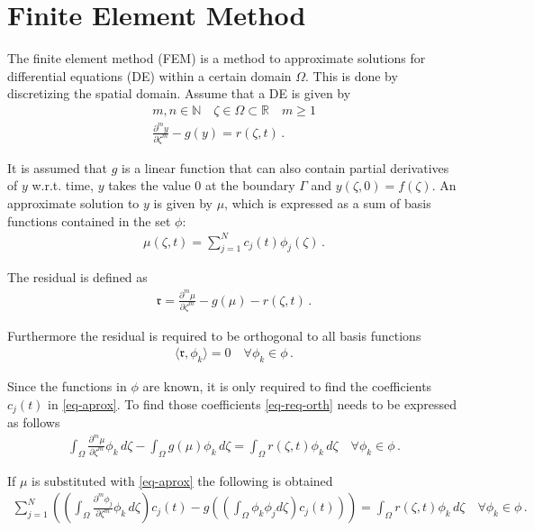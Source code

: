 \section{Finite Element Method} \label{FEM}
The finite element method (FEM) is a method to approximate solutions for differential equations (DE) within a certain domain \(\Omega\).
This is done by discretizing the spatial domain.
Assume that a DE is given by
\begin{gather}
m, n \in \mathbb{N} \quad \zeta \in \Omega \subset \mathbb{R} \quad m \geq 1 \\
\frac{\partial^{m} y}{\partial \zeta^{m}} -  g(y) = r(\zeta, t) \,. \label{eq-pde-gen} 
\end{gather}


It is assumed that \(g\) is a linear function that can also contain partial derivatives of \(y\) w.r.t. time, \(y\) takes the value 0 at the boundary \(\Gamma\) and \(y(\zeta, 0) = f(\zeta)\).
An approximate solution to \(y\) is given by \(\mu\), which is expressed as a sum of basis functions contained in the set \(\phi\):
\begin{gather}
\mu(\zeta, t) = \sum_{j = 1}^{N} c_{j}(t)\phi_{j}(\zeta) \,. \label{eq-aprox}
\end{gather}


The residual is defined as
\begin{gather}
\mathfrak{r} = \frac{\partial^{m} \mu}{\partial \zeta^{m}} -  g(\mu) - r(\zeta, t) \,.
\end{gather}


Furthermore the residual is required to be orthogonal to all basis functions
\begin{gather}
\langle \mathfrak{r}, \phi_{k} \rangle = 0 \quad \forall \phi_{k} \in \phi \,. \label{eq-req-orth}
\end{gather}


Since the functions in \(\phi\) are known, it is only required to find the coefficients \(c_{j}(t)\) in \ref{eq-aprox}.
To find those coefficients \ref{eq-req-orth} needs to be expressed as follows
\begin{gather}
\int_{\Omega} \frac{\partial^{m} \mu}{\partial \zeta^{m}} \phi_{k} \, d\zeta  -  \int_{\Omega} g(\mu) \phi_{k}        \, d\zeta = \int_{\Omega}  r(\zeta, t) \phi_{k}        \, d\zeta \quad \forall \phi_{k} \in \phi \,. 
\end{gather}


If \(\mu\) is substituted with \ref{eq-aprox} the following is obtained
\begin{gather}
\sum_{j = 1}^{N} \left( \left( \int_{\Omega} \frac{\partial^{m} \phi_{j}}{\partial \zeta^{m}} \phi_{k} \, d\zeta\right) c_{j}(t) - g\left( \left(\int_{\Omega} \phi_k \phi_j d\zeta\right) c_{j}(t)\right) \right)  = \int_{\Omega}  r(\zeta, t) \phi_{k}        \, d\zeta \quad \forall \phi_{k} \in \phi \,. \label{eq-al}
\end{gather}


